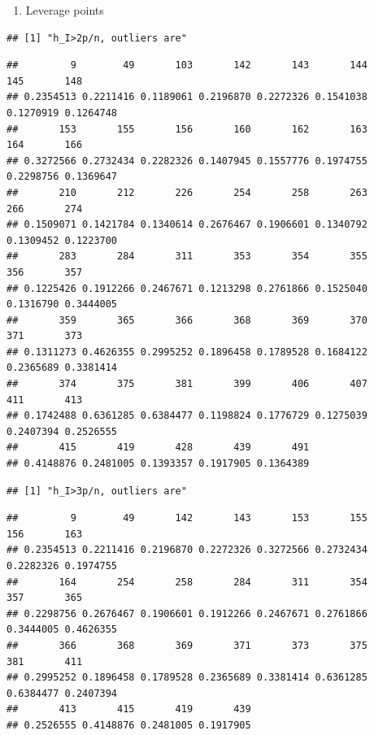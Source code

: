 \documentclass[
]{article}
\providecommand{\tightlist}{%
  \setlength{\itemsep}{0pt}\setlength{\parskip}{0pt}}
\begin{document}
\begin{enumerate}
\def\labelenumi{\arabic{enumi}.}
\setcounter{enumi}{2}
\tightlist
\item
  Leverage points
\end{enumerate}

\begin{verbatim}
## [1] "h_I>2p/n, outliers are"
\end{verbatim}

\begin{verbatim}
##         9        49       103       142       143       144       145       148 
## 0.2354513 0.2211416 0.1189061 0.2196870 0.2272326 0.1541038 0.1270919 0.1264748 
##       153       155       156       160       162       163       164       166 
## 0.3272566 0.2732434 0.2282326 0.1407945 0.1557776 0.1974755 0.2298756 0.1369647 
##       210       212       226       254       258       263       266       274 
## 0.1509071 0.1421784 0.1340614 0.2676467 0.1906601 0.1340792 0.1309452 0.1223700 
##       283       284       311       353       354       355       356       357 
## 0.1225426 0.1912266 0.2467671 0.1213298 0.2761866 0.1525040 0.1316790 0.3444005 
##       359       365       366       368       369       370       371       373 
## 0.1311273 0.4626355 0.2995252 0.1896458 0.1789528 0.1684122 0.2365689 0.3381414 
##       374       375       381       399       406       407       411       413 
## 0.1742488 0.6361285 0.6384477 0.1198824 0.1776729 0.1275039 0.2407394 0.2526555 
##       415       419       428       439       491 
## 0.4148876 0.2481005 0.1393357 0.1917905 0.1364389
\end{verbatim}

\begin{verbatim}
## [1] "h_I>3p/n, outliers are"
\end{verbatim}

\begin{verbatim}
##         9        49       142       143       153       155       156       163 
## 0.2354513 0.2211416 0.2196870 0.2272326 0.3272566 0.2732434 0.2282326 0.1974755 
##       164       254       258       284       311       354       357       365 
## 0.2298756 0.2676467 0.1906601 0.1912266 0.2467671 0.2761866 0.3444005 0.4626355 
##       366       368       369       371       373       375       381       411 
## 0.2995252 0.1896458 0.1789528 0.2365689 0.3381414 0.6361285 0.6384477 0.2407394 
##       413       415       419       439 
## 0.2526555 0.4148876 0.2481005 0.1917905
\end{verbatim}
\end{document}
